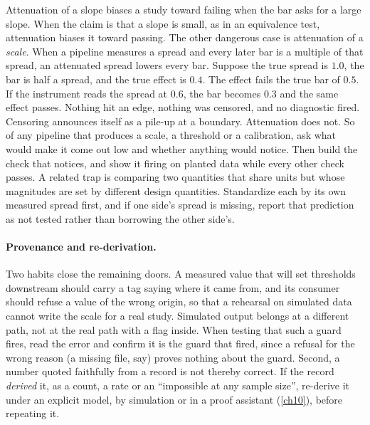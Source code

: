 Attenuation of a slope biases a study toward failing when the bar asks for a large slope. When the claim is that a slope is small, as in an equivalence test, attenuation biases it toward passing. The other dangerous case is attenuation of a \emph{scale}. When a pipeline measures a spread and every later bar is a multiple of that spread, an attenuated spread lowers every bar. Suppose the true spread is $1.0$, the bar is half a spread, and the true effect is $0.4$. The effect fails the true bar of $0.5$. If the instrument reads the spread at $0.6$, the bar becomes $0.3$ and the same effect passes. Nothing hit an edge, nothing was censored, and no diagnostic fired. Censoring announces itself as a pile-up at a boundary. Attenuation does not. So of any pipeline that produces a scale, a threshold or a calibration, ask what would make it come out low and whether anything would notice. Then build the check that notices, and show it firing on planted data while every other check passes. A related trap is comparing two quantities that share units but whose magnitudes are set by different design quantities. Standardize each by its own measured spread first, and if one side's spread is missing, report that prediction as not tested rather than borrowing the other side's.

\paragraph{Provenance and re-derivation.} Two habits close the remaining doors. A measured value that will set thresholds downstream should carry a tag saying where it came from, and its consumer should refuse a value of the wrong origin, so that a rehearsal on simulated data cannot write the scale for a real study. Simulated output belongs at a different path, not at the real path with a flag inside. When testing that such a guard fires, read the error and confirm it is the guard that fired, since a refusal for the wrong reason (a missing file, say) proves nothing about the guard. Second, a number quoted faithfully from a record is not thereby correct. If the record \emph{derived} it, as a count, a rate or an ``impossible at any sample size'', re-derive it under an explicit model, by simulation or in a proof assistant (\cref{ch10}), before repeating it.


